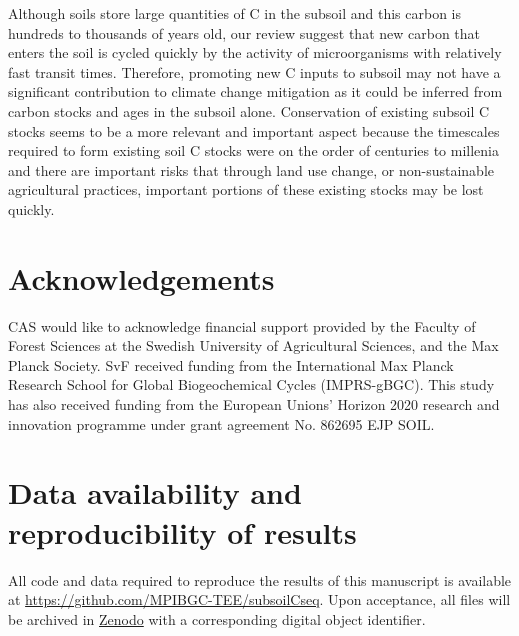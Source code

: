 \documentclass[11pt, oneside, a4paper]{article}   	%
\begin{document}
Although soils store large quantities of C in the subsoil and this carbon is hundreds to thousands of years old, our review suggest that new carbon that enters the soil is cycled quickly by the activity of microorganisms with relatively fast transit times. Therefore, promoting new C inputs to subsoil may not have a significant contribution to climate change mitigation as it could be inferred from carbon stocks and ages in the subsoil alone. Conservation of existing subsoil C stocks seems to be a more relevant and important aspect because the timescales required to form existing soil C stocks were on the order of centuries to millenia and there are important risks that through land use change, or non-sustainable agricultural practices, important portions of these existing stocks may be lost quickly. 

\section*{Acknowledgements}
CAS would like to acknowledge financial support provided by the Faculty of Forest Sciences at the Swedish University of Agricultural Sciences, and the Max Planck Society. SvF received funding from the International Max Planck Research School for Global Biogeochemical Cycles (IMPRS-gBGC). This study has also received funding from the European Unions’ Horizon 2020 research and innovation programme under grant agreement No. 862695 EJP SOIL.

\section*{Data availability and reproducibility of results}
All code and data required to reproduce the results of this manuscript is available at \url{https://github.com/MPIBGC-TEE/subsoilCseq}. Upon acceptance, all files will be archived in \href{https://zenodo.org/}{Zenodo} with a corresponding digital object identifier. 




\end{document}
